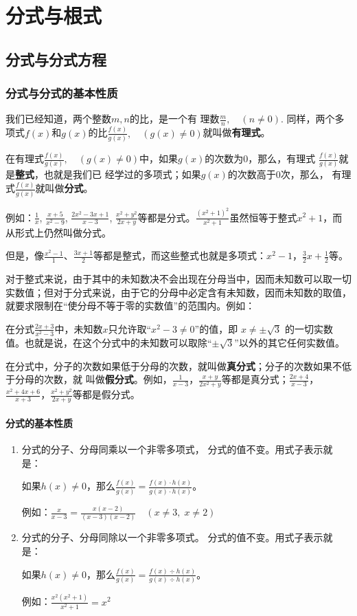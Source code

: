 \chapter{分式与根式}
\section{分式与分式方程}
\subsection{分式与分式的基本性质}
我们已经知道，两个整数$m,n$的比，是一个有
理数$\frac{m}{n},\quad (n\ne 0)$. 同样，两个多项式$f(x)$和$g(x)$的比$\frac{f(x)}{g(x)},\quad (g(x)\ne 0)$就叫做\textbf{有理式}。

在有理式$\frac{f(x)}{g(x)},\quad (g(x)\ne 0)$中，如果$g(x)$的次数为0，那么，有理式
$\frac{f(x)}{g(x)}$就是\textbf{整式}，也就是我们已
经学过的多项式；如果$g(x)$的次数高于0次，那么，
有理式$\frac{f(x)}{g(x)}$就叫做\textbf{分式}。

例如：$\frac{1}{x}$, $\frac{x+5}{x^2-9}$, $\frac{2x^2-3x+1}{x-3}$, $\frac{x^2+y^2}{2x+y}$等都是分式。$\frac{(x^2+1)^2}{x^2+1}$虽然恒等于整式$x^2+1$，而从形式上仍然叫做分式。

但是，像$\frac{x^2-1}{1}$、$\frac{3x+1}{2}$等都是整式，而这些整式也就是多项式：$x^2-1$，$\frac{3}{2}x+\frac{1}{2}$等。

对于整式来说，由于其中的未知数决不会出现在分母当中，因而未知数可以取一切实数值；但对于分式来说，由于它的分母中必定含有未知数，因而未知数的取值，就要求限制在“使分母不等于零的实数值”的范围内。例如：

在分式$\frac{2x+3}{x^2-3}$中，未知数$x$只允许取“$x^2-3\ne 0$”的值，即
$x\ne \pm\sqrt{3}$
的一切实数值。也就是说，在这个分式中的未知数可以取除“$\pm\sqrt{3}$”以外的其它任何实数值。

在分式中，分子的次数如果低于分母的次数，就叫做\textbf{真分式}；分子的次数如果不低于分母的次数，就
叫做\textbf{假分式}。例如，$\frac{1}{x-3}$，$\frac{x+y}{2x^2+y}$等都是真分式；$\frac{2x+4}{x-3}$，$\frac{x^2+4x+6}{x+3}$，$\frac{x^2+y^2}{2x+y}$等都是假分式。

\subsubsection{分式的基本性质}

\begin{enumerate}
\item 分式的分子、分母同乘以一个非零多项式，
分式的值不变。用式子表示就是：

如果$h(x)\ne 0$，那么$\frac{f(x)}{g(x)}=\frac{f(x)\cdot h(x)}{g(x)\cdot h(x)}$。

例如：$\frac{x}{x-3}=\frac{x(x-2)}{(x-3)(x-2)}\quad (x\ne 3,\; x\ne 2)$

\item 分式的分子、分母同除以一个非零多项式。
分式的值不变。用式子表示就是：

如果$h(x)\ne 0$，那么$\frac{f(x)}{g(x)}=\frac{f(x)\div h(x)}{g(x)\div h(x)}$。

例如：$\frac{x^2(x^2+1)}{x^2+1}=x^2$
\end{enumerate}

